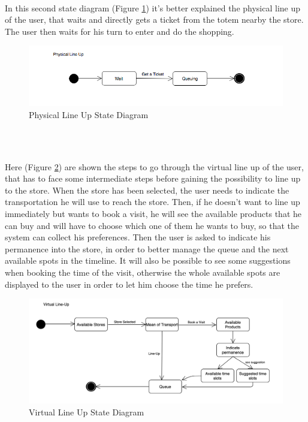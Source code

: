 \documentclass[]{article}
\begin{document}
		
		

		\textbf{}\\ \newpage
		
		In this second state diagram (Figure \ref{fig:state_diagram2}) it’s better explained the physical line up of the user, that waits and directly gets a ticket from the totem nearby the store. The user then waits for his turn to enter and do the shopping.\\

		\begin{figure}[H]
			\centering
			\includegraphics[width=\linewidth]{PhysicalLineUp_statediagram.png}
			\caption{Physical Line Up State Diagram}
			\label{fig:state_diagram2}
		\end{figure}
		
		
		
		
		\textbf{}\\ \newline
		\textbf{}\\ \newline
		
		Here (Figure \ref{fig:state_diagram3})  are shown the steps to go through the virtual line up of the user, that has to face some intermediate steps before gaining the possibility to line up to the store. When the store has been selected, the user needs to indicate the transportation he will use to reach the store. Then, if he doesn't want to line up immediately but wants to book a visit, he will see the available products that he can buy and will have to choose which one of them he wants to buy, so that the system can collect his preferences. Then the user is asked to indicate his permanence into the store, in order to better manage the queue and the next available spots in the timeline. It will also be possible to see some suggestions when booking the time of the visit, otherwise the whole available spots are displayed to the user in order to let him choose the time he prefers.
		
		\begin{figure}[H]
			\centering
			\includegraphics[width=\linewidth]{VirtualLineUp_statediagram.png}
			\caption{Virtual Line Up State Diagram}
			\label{fig:state_diagram3}
		\end{figure}
		
\end{document}
